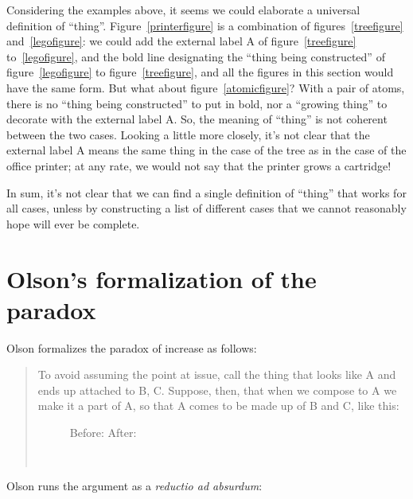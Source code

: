 \documentclass[english,a5paper]{scrartcl}
\newlength{\largeboxwidth}\setlength{\largeboxwidth}{4em}
\begin{document}
Considering the examples above, it seems we could elaborate a universal definition of “thing”. Figure~\ref{printerfigure} is a combination of figures~\ref{treefigure} and~\ref{legofigure}: we could add the external label A of figure~\ref{treefigure} to~\ref{legofigure}, and the bold line designating the “thing being constructed” of figure~\ref{legofigure} to figure~\ref{treefigure}, and all the figures in this section would have the same form. But what about figure~\ref{atomicfigure}? With a pair of atoms, there is no “thing being constructed” to put in bold, nor a “growing thing” to decorate with the external label A. So, the meaning of “thing” is not coherent between the two cases. Looking a little more closely, it’s not clear that the external label A means the same thing in the case of the tree as in the case of the office printer; at any rate, we would not say that the printer grows a cartridge!

In sum, it’s not clear that we can find a single definition of “thing” that works for all cases, unless by constructing a list of different cases that we cannot reasonably hope will ever be complete.

\section{Olson’s formalization of the paradox}
\label{formalization}

Olson formalizes the paradox of increase as follows:

\begin{quote}
To avoid assuming the point at issue, call the thing that looks like A and ends up attached to B, C. Suppose, then, that when we compose to A we make it a part of A, so that A comes to be made up of B and C, like this:

\begin{figure}[h]
  \centering%
  Before: \hspace{1em}\hspace{5ex}%
  After: \begin{varwidth}[t]{1in}\usebox{\combinedthing}\\\end{varwidth}
  \caption{}
\end{figure}
\end{quote}

Olson runs the argument as a \emph{reductio ad absurdum}:
\end{document}
